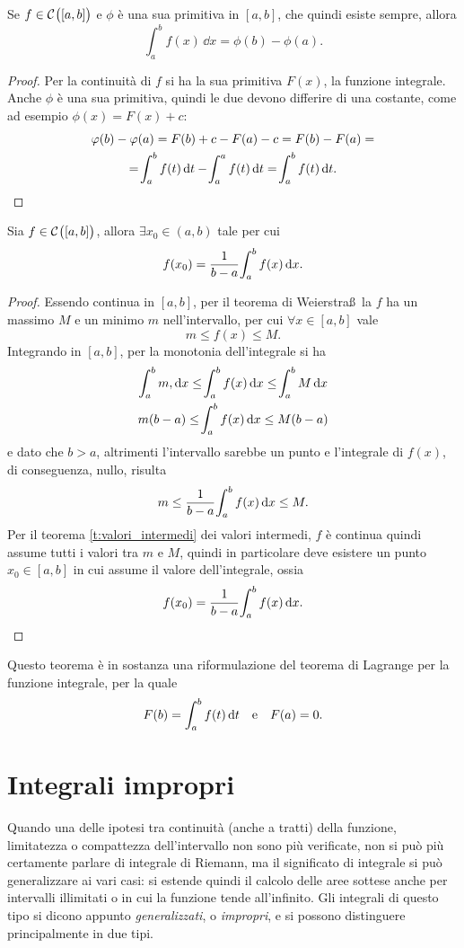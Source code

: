 \begin{teorema} \label{t:tfci2}
Se $f\in\mathcal{C}^{{}}\big([a,b]\big)$ e $\phi$ è una sua primitiva in $[a,b]$, che quindi esiste sempre, allora
\begin{equation}
\int_a^bf(x)\,\dd x=\phi(b)-\phi(a).
\end{equation}
\end{teorema}
\begin{proof}
Per la continuità di $f$ si ha la sua primitiva $F(x)$, la funzione integrale. Anche $\phi$ è una sua primitiva, quindi le due devono differire di una costante, come ad esempio $\phi(x)=F(x)+c$:
\begin{multline*}
\varphi(b)-\varphi(a)=F(b)+c-F(a)-c=F(b)-F(a)=\\
=\!\int_a^bf(t)\,\textup{d} t-\!\int_a^af(t)\,\textup{d} t=\!\int_a^bf(t)\,\textup{d} t.\qedhere
\end{multline*}
\end{proof}
\begin{teorema} \label{t:media-integrale}
Sia $f\in\mathcal{C}^{{}}\big([a,b]\big)$, allora $\exists x_0\in(a,b)$ tale per cui
\begin{equation}
f(x_0)=\frac1{b-a}\!\int_a^bf(x)\,\textup{d} x.
\end{equation}
\end{teorema}
\begin{proof}
Essendo continua in $[a,b]$, per il teorema di Weierstra\ss\ la $f$ ha un massimo $M$ e un minimo $m$ nell'intervallo, per cui $\forall x\in[a,b]$ vale
\[
m\leq f(x)\leq M.
\]
Integrando in $[a,b]$, per la monotonia dell'integrale si ha
\begin{gather*}
\int_a^bm,\textup{d} x\leq\!\int_a^bf(x)\,\textup{d} x\leq\!\int_a^bM\,\textup{d} x\\
m(b-a)\leq\!\int_a^bf(x)\,\textup{d} x\leq M(b-a)
\end{gather*}
e dato che $b>a$, altrimenti l'intervallo sarebbe un punto e l'integrale di $f(x)$, di conseguenza, nullo, risulta
\[
m\leq\frac1{b-a}\!\int_a^bf(x)\,\textup{d} x\leq M.
\]
Per il teorema \ref{t:valori_intermedi} dei valori intermedi, $f$ è continua quindi assume tutti i valori tra $m$ e $M$, quindi in particolare deve esistere un punto $x_0\in[a,b]$ in cui assume il valore dell'integrale, ossia
\[
f(x_0)=\frac1{b-a}\!\int_a^bf(x)\,\textup{d} x.
\]
\end{proof}
Questo teorema è in sostanza una riformulazione del teorema di Lagrange per la funzione integrale, per la quale
\[
F(b)=\int_a^bf(t)\,\textup{d} t\quad\text{e}\quad F(a)=0.
\]

\section{Integrali impropri}
Quando una delle ipotesi tra continuità (anche a tratti) della funzione, limitatezza o compattezza dell'intervallo non sono più verificate, non si può più certamente parlare di integrale di Riemann, ma il significato di integrale si può generalizzare ai vari casi: si estende quindi il calcolo delle aree sottese anche per intervalli illimitati o in cui la funzione tende all'infinito. Gli integrali di questo tipo si dicono appunto \emph{generalizzati}, o \emph{impropri}, e si possono distinguere principalmente in due tipi.

